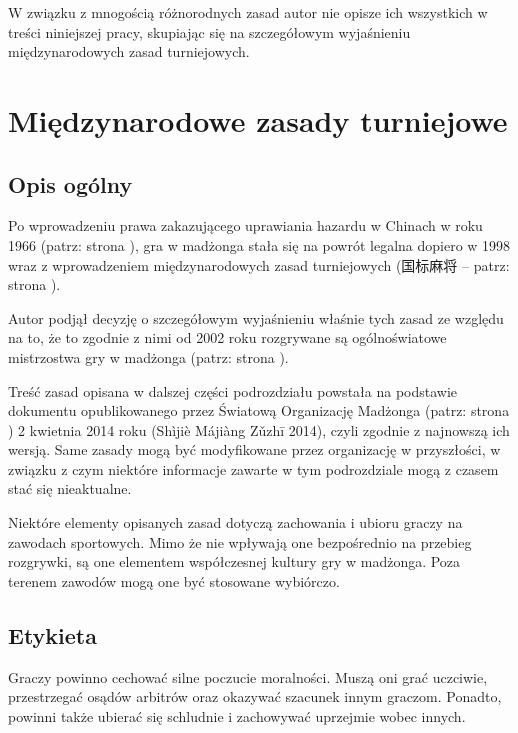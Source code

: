 W związku z mnogością różnorodnych zasad autor nie opisze ich wszystkich w
treści niniejszej pracy, skupiając się na szczegółowym wyjaśnieniu
międzynarodowych zasad turniejowych.

\section{Międzynarodowe zasady turniejowe}
\label{guobiao}
\subsection{Opis ogólny}
Po wprowadzeniu prawa zakazującego uprawiania hazardu w Chinach w roku 1966
(patrz: strona \pageref{zakaz_1966}), gra w madżonga stała się na powrót legalna
dopiero w 1998 wraz z wprowadzeniem międzynarodowych zasad turniejowych (国标麻将
 -- patrz: strona \pageref{relegalizacja}).

Autor podjął decyzję o szczegółowym wyjaśnieniu właśnie tych zasad ze względu na
to, że to zgodnie z nimi od 2002 roku rozgrywane są ogólnoświatowe mistrzostwa
gry w madżonga (patrz: strona \pageref{pierwsze_mistrzostwa}).

Treść zasad opisana w dalszej części podrozdziału powstała na podstawie
dokumentu opublikowanego przez Światową Organizację Madżonga (patrz: strona
\pageref{wmo}) 2 kwietnia 2014 roku (Shìjiè Májiàng Zǔzhī 2014), czyli zgodnie
z najnowszą ich wersją. Same zasady mogą być modyfikowane przez organizację w
przyszłości, w związku z czym niektóre informacje zawarte w tym podrozdziale
mogą z czasem stać się nieaktualne.

Niektóre elementy opisanych zasad dotyczą zachowania i ubioru graczy na zawodach
sportowych. Mimo że nie wpływają one bezpośrednio na przebieg rozgrywki, są one
elementem współczesnej kultury gry w madżonga. Poza terenem zawodów mogą one być
stosowane wybiórczo.

\subsection{Etykieta}
Graczy powinno cechować silne poczucie moralności. Muszą oni grać uczciwie,
przestrzegać osądów arbitrów oraz okazywać szacunek innym graczom. Ponadto,
powinni także ubierać się schludnie i zachowywać uprzejmie wobec innych.

